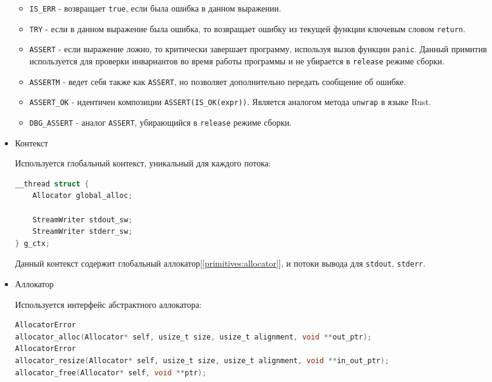 \begin{itemize}
\begin{itemize}
    \item \verb|IS_ERR| - возвращает \verb|true|, если была ошибка в данном выражении.

    \item \verb|TRY| - если в данном выражение была ошибка, то возвращает ошибку из текущей функции ключевым словом \verb|return|.

    \item \verb|ASSERT| - если выражение ложно, то критически завершает программу, используя вызов функции \verb|panic|.
    Данный примитив используется для проверки инвариантов во время работы программы и не убирается в \verb|release| режиме сборки.

    \item \verb|ASSERTM| - ведет себя также как \verb|ASSERT|, но позволяет дополнительно передать сообщение об ошибке.

    \item \verb|ASSERT_OK| - идентичен композиции \verb|ASSERT(IS_OK(expr))|.
    Является аналогом метода \verb|unwrap| в языке Rust.

    \item \verb|DBG_ASSERT| - аналог \verb|ASSERT|, убирающийся в \verb|release| режиме сборки.
\end{itemize}

\item Контекст

Используется глобальный контекст, уникальный для каждого потока:

\begin{lstlisting}[language=c, caption={Структура глобального контекста}, label={primitives:g_ctx-struct}]
__thread struct {
    Allocator global_alloc;

    StreamWriter stdout_sw;
    StreamWriter stderr_sw;
} g_ctx;
\end{lstlisting} 

Данный контекст содержит глобальный аллокатор[\ref{primitives:allocator}], и потоки вывода для \verb|stdout|, \verb|stderr|.

\item\label{primitives:allocator} Аллокатор

Используется интерфейс абстрактного аллокатора:

\begin{lstlisting}[language=c, caption={Макросы обработки ошибок}, label={primitives:error-macros}]
AllocatorError
allocator_alloc(Allocator* self, usize_t size, usize_t alignment, void **out_ptr);
AllocatorError
allocator_resize(Allocator* self, usize_t size, usize_t alignment, void **in_out_ptr);
allocator_free(Allocator* self, void **ptr);


\end{lstlisting}
\end{itemize}
